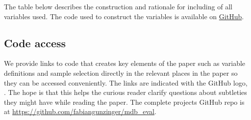 The table below describes the construction and rationale for including of all
variables used. The code used to construct the variables is available on
\href{https://github.com/fabiangunzinger/mdb_eval/blob/d094f8cd364f64bbe3d4e644abbff726af86de2f/src/data/aggregators.py}{GitHub}.




\subsection{Code access}%
\label{sub:code_access}

We provide links to code that creates key elements of the paper such as
variable definitions and sample selection directly in the relevant places in
the paper so they can be accessed conveniently. The links are indicated with
the GitHub logo, \faGithub. The hope is that this helps the
curious reader clarify questions about subtleties they might have while reading
the paper. The complete projects GitHub repo is at
\href{https://github.com/fabiangunzinger/mdb\_eval}{https://github.com/fabiangunzinger/mdb\_eval}.


